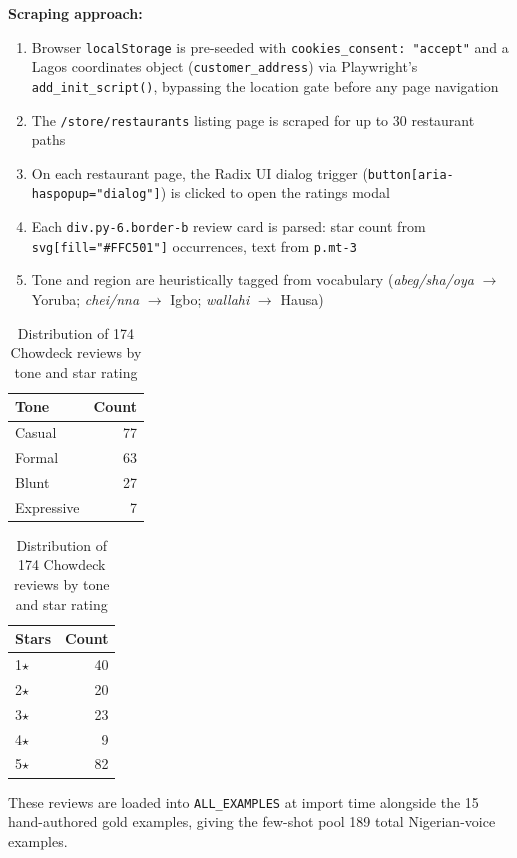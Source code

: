\documentclass[11pt]{article}
\begin{document}
\textbf{Scraping approach:}
\begin{enumerate}
    \item Browser \texttt{localStorage} is pre-seeded with \texttt{cookies\_consent: "accept"} and a Lagos coordinates object (\texttt{customer\_address}) via Playwright's \texttt{add\_init\_script()}, bypassing the location gate before any page navigation
    \item The \texttt{/store/restaurants} listing page is scraped for up to 30 restaurant paths
    \item On each restaurant page, the Radix UI dialog trigger (\texttt{button[aria-haspopup="dialog"]}) is clicked to open the ratings modal
    \item Each \texttt{div.py-6.border-b} review card is parsed: star count from \texttt{svg[fill="\#FFC501"]} occurrences, text from \texttt{p.mt-3}
    \item Tone and region are heuristically tagged from vocabulary (\textit{abeg/sha/oya} $\rightarrow$ Yoruba; \textit{chei/nna} $\rightarrow$ Igbo; \textit{wallahi} $\rightarrow$ Hausa)
\end{enumerate}

\begin{table}[h]
\centering
\begin{tabular}{lr}
\toprule
\textbf{Tone} & \textbf{Count} \\
\midrule
Casual & 77 \\
Formal & 63 \\
Blunt & 27 \\
Expressive & 7 \\
\bottomrule
\end{tabular}
\hspace{2em}
\begin{tabular}{lr}
\toprule
\textbf{Stars} & \textbf{Count} \\
\midrule
1$\star$ & 40 \\
2$\star$ & 20 \\
3$\star$ & 23 \\
4$\star$ & 9 \\
5$\star$ & 82 \\
\bottomrule
\end{tabular}
\caption{Distribution of 174 Chowdeck reviews by tone and star rating}
\end{table}

These reviews are loaded into \texttt{ALL\_EXAMPLES} at import time alongside the 15 hand-authored gold examples, giving the few-shot pool 189 total Nigerian-voice examples.
\end{document}
